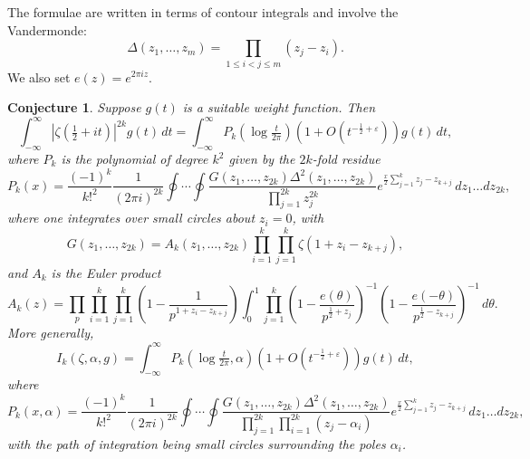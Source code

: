\documentclass[12pt,letterpaper]{amsart}
\theoremstyle{plain}
\newtheorem{conjecture}[theorem]{Conjecture}
\theoremstyle{definition}
\theoremstyle{remark}
\numberwithin{equation}{subsection}
\numberwithin{theorem}{subsection}
\numberwithin{table}{subsection}
\begin{document}
The formulae are written in terms of contour integrals and involve
the Vandermonde:
\begin{equation}
\Delta(z_1,\dots,z_{m})=\prod_{1\le i < j\le m}(z_j-z_i).\label{eqn:vandermonde}
\end{equation}
We also set $e(z)=e^{2\pi i z}$.

\begin{conjecture} \label{thm:zeta2kconjecture}
 Suppose $g(t)$ is a suitable weight function. Then
\begin{equation}
\int_{-\infty}^\infty |\zeta(\tfrac12 +it)|^{2k}g(t)\,dt= \int_{-\infty}^\infty
P_k\left(\log \tfrac{t}{2 \pi}\right)
(1+O(t^{-\frac{1}{2}+\varepsilon})) g(t) \,dt ,
\end{equation}
where $P_k$ is the polynomial of degree $k^2$ given by the
$2k$-fold residue
\begin{equation}
P_k(x)= \frac{(-1)^k}{k!^2}\frac{1}{(2\pi i)^{2k}} \oint\cdots
\oint \frac{G(z_1, \dots,z_{2k})\Delta^2(z_1,\dots,z_{2k})}
{\displaystyle \prod_{j=1}^{2k} z_j^{2k}} 
e^{\tfrac x2 \sum_{j=1}^{k}z_j-z_{k+j}}\,dz_1\dots dz_{2k} ,
\end{equation}
where one integrates over small circles about $z_i=0$, with
\begin{equation}
G(z_1,\dots,z_{2k})= A_k(z_1,\dots,z_{2k})
\prod_{i=1}^k\prod_{j=1}^k\zeta(1+z_i-z_{k+j}) ,
\end{equation}
and $A_k$ is the Euler product
\begin{equation}
A_k(z) =\prod_p \prod_{i=1}^k\prod_{j=1}^k
\left(1-\frac{1}{p^{1+z_i-z_{k+j}}}\right) \int_0^1 \prod_{j=1}^k
\left(1-\frac{e(\theta)}{p^{\frac12 +z_j}}\right)^{-1}
\left(1-\frac{e(-\theta)}{p^{\frac12 -z_{k+j}}}\right)^{-1}\,d\theta.
\end{equation}
More generally,
\begin{equation}
I_k(\zeta,\alpha,g)= \int_{-\infty}^\infty 
P_k\left(\log \tfrac{t}{2 \pi} , \alpha\right) (1+O(t^{-\frac{1}{2}+\varepsilon})) g(t)\,dt ,
\end{equation}
where
\begin{equation}
P_k(x,\alpha)=
 \frac{(-1)^k}{k!^2}\frac{1}{(2\pi i)^{2k}}
\oint \cdots \oint \frac{G(z_1,
\dots,z_{2k})\Delta^2(z_1,\dots,z_{2k})} {\displaystyle
\prod_{j=1}^{2k} \prod_{i=1}^{2k}(z_j-\alpha_i)} 
e^{\tfrac x2 \sum_{j=1}^{k}z_j-z_{k+j}}\,dz_1\dots dz_{2k},
\end{equation}
with the path of integration being small circles surrounding the poles
$\alpha_i$.
\end{conjecture}
\end{document}
